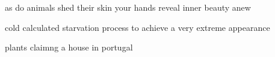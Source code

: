 as do animals shed their skin your hands reveal inner beauty anew

cold calculated starvation process to achieve a very extreme appearance

plants claimng a house in portugal
